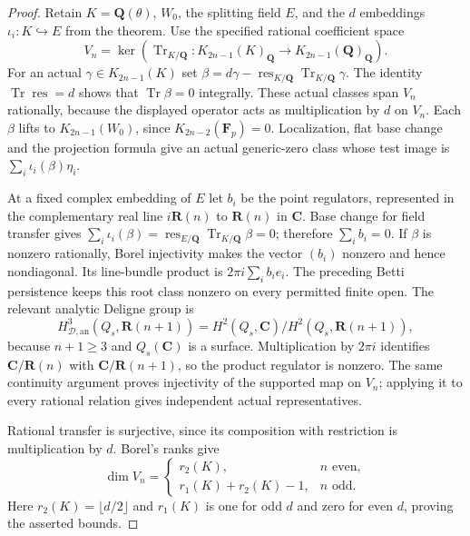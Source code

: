 \documentclass[11pt,a4paper]{article}
\theoremstyle{remark}
\newcommand{\Q}{\mathbf Q}
\newcommand{\R}{\mathbf R}
\newcommand{\C}{\mathbf C}
\newcommand{\F}{\mathbf F}
\begin{document}
\begin{proof}
Retain $K=\Q(\theta)$, $W_0$, the splitting field $E$, and the
$d$ embeddings $\iota_i:K\hookrightarrow E$ from the theorem.
Use the specified rational coefficient space
\[
 V_n=\ker\left(\operatorname{Tr}_{K/\Q}:
       K_{2n-1}(K)_{\Q}\longrightarrow K_{2n-1}(\Q)_{\Q}\right).
\]
For an actual $\gamma\in K_{2n-1}(K)$ set
$\beta=d\gamma-\operatorname{res}_{K/\Q}
                 \operatorname{Tr}_{K/\Q}\gamma$.
The identity $\operatorname{Tr}\operatorname{res}=d$ shows
that $\operatorname{Tr}\beta=0$ integrally. These actual
classes span $V_n$ rationally, because the displayed operator
acts as multiplication by $d$ on $V_n$.
Each $\beta$ lifts to $K_{2n-1}(W_0)$, since
$K_{2n-2}(\F_p)=0$. Localization, flat base change and the
projection formula give an actual generic-zero class whose
test image is $\sum_i\iota_i(\beta)\eta_i$.

At a fixed complex embedding of $E$ let $b_i$ be the point
regulators, represented in the complementary real line
$i\R(n)$ to $\R(n)$ in $\C$. Base change for field transfer
gives $\sum_i\iota_i(\beta)=
\operatorname{res}_{E/\Q}\operatorname{Tr}_{K/\Q}\beta=0$;
therefore $\sum_i b_i=0$. If $\beta$ is nonzero rationally,
Borel injectivity makes the vector $(b_i)$ nonzero and hence
nondiagonal. Its line-bundle product is
$2\pi i\sum_i b_i e_i$. The preceding Betti persistence
keeps this root class nonzero on every permitted finite open.
The relevant analytic Deligne group is
\[
 H^3_{\mathcal D,\mathrm{an}}(Q_s,\R(n+1))
   =H^2(Q_s,\C)/H^2(Q_s,\R(n+1)),
\]
because $n+1\ge3$ and $Q_s(\C)$ is a surface.
Multiplication by $2\pi i$ identifies
$\C/\R(n)$ with $\C/\R(n+1)$, so the product regulator
is nonzero. The same continuity argument proves injectivity
of the supported map on $V_n$; applying it to every rational
relation gives independent actual representatives.

Rational transfer is surjective, since its composition with
restriction is multiplication by $d$. Borel's ranks give
\[
 \dim V_n=
 \begin{cases}
 r_2(K),&n\text{ even},\\
 r_1(K)+r_2(K)-1,&n\text{ odd}.
 \end{cases}
\]
Here $r_2(K)=\lfloor d/2\rfloor$ and $r_1(K)$ is one for
odd $d$ and zero for even $d$, proving the asserted bounds.
\end{proof}

\end{document}
